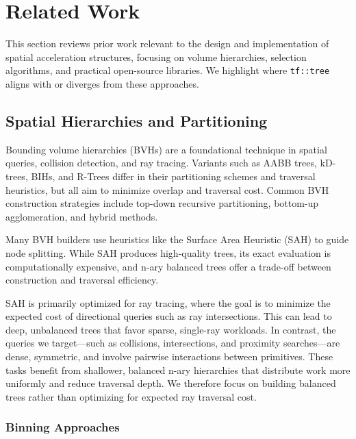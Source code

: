 \section{Related Work}

This section reviews prior work relevant to the design
and implementation of spatial acceleration structures,
focusing on volume hierarchies, selection algorithms,
and practical open-source libraries. We highlight where
\texttt{tf::tree} aligns with or diverges from these approaches.

\subsection{Spatial Hierarchies and Partitioning}

Bounding volume hierarchies (BVHs) \cite{bvh-survey} are a foundational technique
in spatial queries, collision detection, and ray tracing.
Variants such as AABB trees\cite{van1997efficient},
kD-trees\cite{bentley1975multidimensional},
BIHs\cite{wachter2006instant}, and R-Trees\cite{r-tree} differ in their
partitioning schemes and traversal heuristics, but all aim to
minimize overlap and traversal cost. Common BVH construction
strategies include top-down recursive partitioning,
bottom-up agglomeration, and hybrid methods.

Many BVH builders use heuristics like the Surface Area Heuristic
(SAH)\cite{macdonald1990heuristics}
to guide node splitting. While SAH produces high-quality
trees, its exact evaluation is computationally expensive,
and n-ary balanced trees offer a trade-off between construction
and traversal efficiency.

SAH is primarily optimized for ray tracing, where the
goal is to minimize the expected cost of directional
queries such as ray intersections. This can lead to
deep, unbalanced trees that favor sparse, single-ray
workloads. In contrast, the queries we target—such as
collisions, intersections, and proximity searches—are
dense, symmetric, and involve pairwise interactions
between primitives. These tasks benefit from shallower,
balanced n-ary hierarchies that distribute work more uniformly
and reduce traversal depth. We therefore focus on
building balanced trees rather than optimizing for
expected ray traversal cost.

\subsubsection{Binning Approaches}

